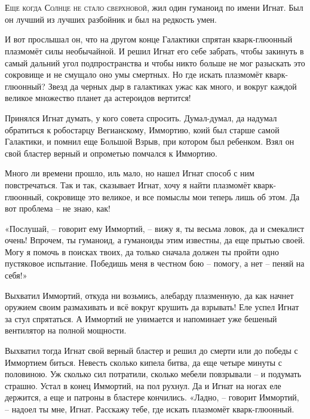 \documentclass[ebook,oneside,final,openright]{memoir}
\begin{document}
\chapter{}
 \lettrine{Е}{ще когда Солнце не стало сверхновой,} жил один гуманоид по имени Игнат. Был он лучший из лучших разбойник и был на редкость умен.\par
\par
И вот прослышал он, что на другом конце Галактики спрятан кварк-глюонный плазмомёт силы необычайной. И решил Игнат его себе забрать, чтобы закинуть в самый дальний угол подпространства и чтобы никто больше не мог разыскать это сокровище и не смущало оно умы смертных. Но где искать плазмомёт кварк-глюонный? Звезд да черных дыр в галактиках ужас как много, и вокруг каждой великое множество планет да астероидов вертится!\par
\par
Принялся Игнат думать, у кого совета спросить. Думал-думал, да надумал обратиться к робостарцу Вегианскому, Иммортию, коий был старше самой Галактики, и помнил еще Большой Взрыв, при котором был ребенком. Взял он свой бластер верный и опрометью помчался к Иммортию.\par
\par
Много ли времени прошло, иль мало, но нашел Игнат способ с ним повстречаться. Так и так, сказывает Игнат, хочу я найти плазмомёт кварк-глюонный, сокровище это великое, и все помыслы мои теперь лишь об этом. Да вот проблема – не знаю, как!\par
\par
«Послушай, – говорит ему Иммортий, – вижу я, ты весьма ловок, да и смекалист очень! Впрочем, ты гуманоид, а гуманоиды этим известны, да еще прытью своей. Могу я помочь в поисках твоих, да только сначала должен ты пройти одно пустяковое испытание. Победишь меня в честном бою – помогу, а нет – пеняй на себя!» \par
\par
Выхватил Иммортий, откуда ни возьмись, алебарду плазменную, да как начнет оружием своим размахивать и всё вокруг крушить да взрывать! Еле успел Игнат за стул спрятаться. А Иммортий не унимается и напоминает уже бешеный вентилятор на полной мощности. \par
\par
Выхватил тогда Игнат свой верный бластер и решил до смерти или до победы с Иммортием биться. Невесть сколько кипела битва, да еще четыре минуты с половиною. Уж сколько сил потратили, сколько мебели повзрывали – и подумать страшно. Устал в конец Иммортий, на пол рухнул. Да и Игнат на ногах еле держится, а еще и патроны в бластере кончились. «Ладно, – говорит Иммортий, – надоел ты мне, Игнат. Расскажу тебе, где искать плазмомёт кварк-глюонный.\par
\end{document}
